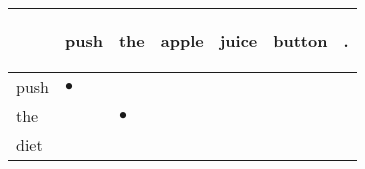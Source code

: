 \documentclass[landscape]{article}
\newcommand{\ssp}{\hspace{2pt}}
\newcommand{\mex}{\cellcolor{g}$\bullet$}
\begin{document}
\noindent\begin{tabular}{|l|p{10pt}|p{10pt}|p{10pt}|p{10pt}|p{10pt}|p{10pt}|}
\hline
&\begin{sideways}\cellcolor{ref0}push\hspace{12pt}\end{sideways}&\begin{sideways}\cellcolor{ref1}the\hspace{12pt}\end{sideways}&\begin{sideways}\cellcolor{ref2}apple\hspace{12pt}\end{sideways}&\begin{sideways}\cellcolor{ref3}juice\hspace{12pt}\end{sideways}&\begin{sideways}\cellcolor{ref4}button\hspace{12pt}\end{sideways}&\begin{sideways}\cellcolor{ref5}.\hspace{12pt}\end{sideways}\\
\hline
\ssp \cellcolor{ref0}push \ssp&\hspace{2pt}\mex&\hspace{2pt}&\hspace{2pt}&\hspace{2pt}&\hspace{2pt}&\hspace{2pt}\\
\hline
\ssp \cellcolor{ref1}the \ssp&\hspace{2pt}&\hspace{2pt}\mex&\hspace{2pt}&\hspace{2pt}&\hspace{2pt}&\hspace{2pt}\\
\hline
\ssp diet \ssp&\hspace{2pt}&\hspace{2pt}&\hspace{2pt}&\hspace{2pt}&\hspace{2pt}&\hspace{2pt}\\

\end{tabular}
\end{document}
